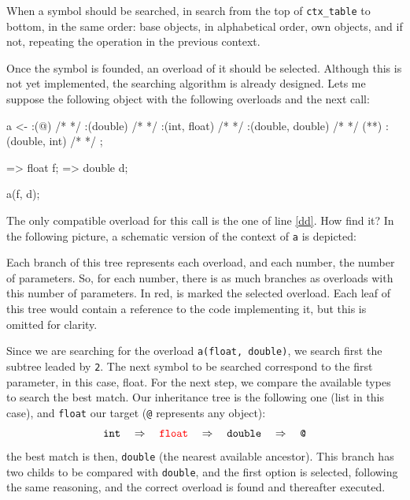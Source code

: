\documentclass{article}
\begin{document}
When a symbol should be searched, in search from the top of \texttt{ctx\_table}
to bottom, in the same order: base objects, in alphabetical order, own objects,
and if not, repeating the operation in the previous context.

Once the symbol is founded, an overload of it should be selected. Although this
is not yet implemented, the searching algorithm is already designed. Lets me
suppose the following object with the following overloads and the next call:

\begin{faupp2}
  a <- :(@) { /* */ }
       :(double) { /* */ }
       :(int, float) { /* */ }
       :(double, double) { /* */ } (*\label{dd}*)
       :(double, int) { /* */ }
       ;

  => float f;
  => double d;

  a(f, d);
\end{faupp2}

The only compatible overload for this call is the one of line \ref{dd}. How
\faupp find it? In the following picture, a schematic version of the context of
\texttt{a} is depicted:

\begin{figure}[h!]
\begin{center}
\end{center}
\end{figure}

Each branch of this tree represents each overload, and each number, the number
of parameters. So, for each number, there is as much branches as overloads with
this number of parameters. In red, is marked the selected overload. Each leaf of
this tree would contain a reference to the code implementing it, but this is
omitted for clarity.

Since we are searching for the overload \texttt{a(float, double)}, we search
first the subtree leaded by \texttt{2}. The next symbol to be searched
correspond to the first parameter, in this case, float. For the next step, we
compare the available types to search the best match. Our inheritance tree is
the following one (list in this case), and \texttt{float} our target (\texttt{@}
represents any object):
\[ \mbox{\texttt{int}} \quad \Rightarrow \quad
   \mbox{\texttt{\textcolor{red}{float}}} \quad \Rightarrow \quad
   \mbox{\texttt{double}} \quad \Rightarrow \quad
   \mbox{\texttt{@}} \]
the best match is then, \texttt{double} (the nearest available ancestor). This
branch has two childs to be compared with \texttt{double}, and the first option
is selected, following the same reasoning, and the correct overload is found and
thereafter executed.
\end{document}
